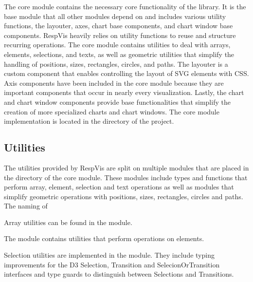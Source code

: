 The core module contains the necessary core functionality of the library.
It is the base module that all other modules depend on and includes various utility functions, the layouter, axes, chart base components, and chart window base components.
RespVis heavily relies on utility functions to reuse and structure recurring operations.
The core module contains utilities to deal with arrays, elements, selections, and texts, as well as geometric utilities that simplify the handling of positions, sizes, rectangles, circles, and paths. 
The layouter is a custom component that enables controlling the layout of SVG elements with CSS.
Axis components have been included in the core module because they are important components that occur in nearly every visualization. 
Lastly, the chart and chart window components provide base functionalities that simplify the creation of more specialized charts and chart windows.
The core module implementation is located in the  directory of the project.

\subsection{Utilities}

The utilities provided by RespVis are split on multiple modules that are placed in the  directory of the core module.
These modules include types and functions that perform array, element, selection and text operations as well as modules that simplify geometric operations with positions, sizes, rectangles, circles and paths.
The naming of 


Array utilities can be found in the  module.

The  module contains utilities that perform operations on elements. 

Selection utilities are implemented in the  module.
They include typing improvements for the D3 Selection, Transition and SelecionOrTransition interfaces and type guards to distinguish between Selections and Transitions.

